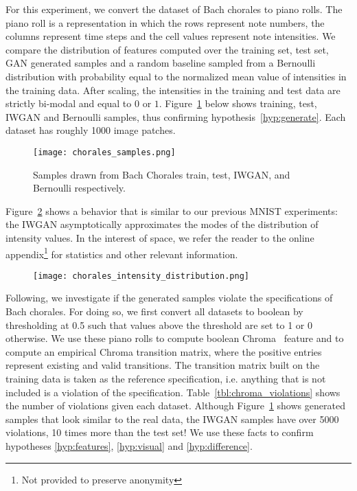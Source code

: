 For this experiment, we convert the dataset of Bach chorales to piano rolls. The
piano roll is a representation in which the rows represent note numbers, the columns
represent time steps and the cell values represent note intensities. We compare
the distribution of features computed over the training set, test set, GAN
generated samples and a random baseline sampled from a Bernoulli distribution with 
probability equal to the normalized mean value of intensities in the
training data. After scaling, the intensities in the training and test data are
strictly bi-modal and equal to $0$ or $1$. Figure~\ref{fig:chorales_samples} below
shows training, test, IWGAN and Bernoulli samples, thus confirming
hypothesis~\ref{hyp:generate}. Each dataset has roughly 1000 image patches.

\begin{figure}[!h]
  \begin{center}
  \texttt{[image: chorales\_samples.png]}
  \caption{Samples drawn from Bach Chorales train, test,
IWGAN, and Bernoulli respectively.}
  \label{fig:chorales_samples}
  \end{center}
\end{figure}

Figure~\ref{fig:chorales_intensity_distribution} shows a behavior that is
similar to our previous MNIST experiments: the IWGAN asymptotically approximates
the modes of the distribution of intensity values. In the 
interest of space, we refer the reader to the online appendix\footnote{Not
provided to preserve anonymity} for statistics and other relevant information. 

\begin{figure}[!h]
  \texttt{[image: chorales\_intensity\_distribution.png]}
  \caption{}
  \label{fig:chorales_intensity_distribution}
\end{figure}

Following, we investigate if the generated samples violate the specifications of
Bach chorales. For doing so, we first convert all datasets to boolean by 
thresholding at 0.5 such that values above the threshold are set to 1 or 0
otherwise. We use
these piano rolls to compute boolean Chroma~\cite{peeters2004large} feature and
to compute an empirical Chroma transition matrix, where the positive
entries represent existing and valid transitions. The transition matrix built on 
the training data is taken as the reference specification, i.e. anything that is 
not included is a violation of the specification. Table~\ref{tbl:chroma_violations}
shows the number of violations given each dataset. Although
Figure~\ref{fig:chorales_samples} shows generated samples that look similar to
the real data, the IWGAN samples have over 5000
violations, 10 times more than the test set! We use these facts to confirm
hypotheses \ref{hyp:features}, \ref{hyp:visual} and \ref{hyp:difference}.


